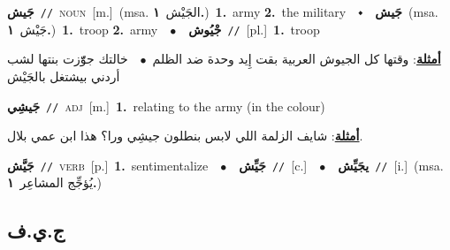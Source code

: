\documentclass[10pt,a4paper,twoside]{article} %
\begin{document}
\begin{multicols}{2}
{\setlength\topsep{0pt}\textbf{\foreignlanguage{arabic}{جَيش}}\ {\color{gray}\texttt{//}\color{black}}\ \textsc{noun}\ [m.]\ \color{gray}(msa. \foreignlanguage{arabic}{الجَيْش}~\foreignlanguage{arabic}{\textbf{١.}})\color{black}\ \textbf{1.}~army  \textbf{2.}~the military\ \ $\smblkdiamond$\ \ \setlength\topsep{0pt}\textbf{\foreignlanguage{arabic}{جَيش}}\ \color{gray}(msa. \foreignlanguage{arabic}{جَيْش}~\foreignlanguage{arabic}{\textbf{١.}})\color{black}\ \textbf{1.}~troop  \textbf{2.}~army\ \ $\bullet$\ \ \setlength\topsep{0pt}\textbf{\foreignlanguage{arabic}{جْيُوش}}\ {\color{gray}\texttt{//}\color{black}}\ [pl.]\ \textbf{1.}~troop\  \begin{flushright}\color{gray}\foreignlanguage{arabic}{\textbf{\underline{\foreignlanguage{arabic}{أمثلة}}}: وقتها كل الجيوش العربية بقت إِيد وحدة ضد الظلم\ $\bullet$\ \  خالتك جوّّزت بنتها لشب أردني بيشتغل بالجَيْش}\end{flushright}\color{black}} \vspace{2mm}

{\setlength\topsep{0pt}\textbf{\foreignlanguage{arabic}{جَيشِي}}\ {\color{gray}\texttt{//}\color{black}}\ \textsc{adj}\ [m.]\ \textbf{1.}~relating to the army (in the colour)\  \begin{flushright}\color{gray}\foreignlanguage{arabic}{\textbf{\underline{\foreignlanguage{arabic}{أمثلة}}}: شايف الزلمة اللي لابس بنطلون جيشِي ورا؟ هذا ابن عمي بلال.}\end{flushright}\color{black}} \vspace{2mm}

{\setlength\topsep{0pt}\textbf{\foreignlanguage{arabic}{جَيَّش}}\ {\color{gray}\texttt{//}\color{black}}\ \textsc{verb}\ [p.]\ \textbf{1.}~sentimentalize\ \ $\bullet$\ \ \setlength\topsep{0pt}\textbf{\foreignlanguage{arabic}{جَيِّش}}\ {\color{gray}\texttt{//}\color{black}}\ [c.]\ \ $\bullet$\ \ \setlength\topsep{0pt}\textbf{\foreignlanguage{arabic}{يجَيِّش}}\ {\color{gray}\texttt{//}\color{black}}\ [i.]\ \color{gray}(msa. \foreignlanguage{arabic}{يُؤجِّج المشاعِر}~\foreignlanguage{arabic}{\textbf{١.}})\color{black}\ } \vspace{2mm}

\vspace{-3mm}
\subsection*{\color{blue}\foreignlanguage{arabic}{ج.ي.ف}\color{blue}{}} 


\end{multicols}
\end{document}
